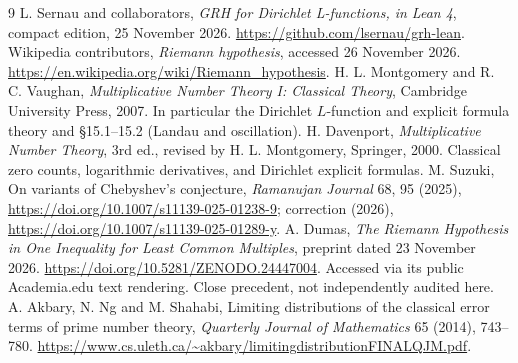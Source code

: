\documentclass[11pt]{article}
\begin{document}
\begin{thebibliography}{9}\small
{} L. Sernau and collaborators, \emph{GRH for Dirichlet L-functions, in Lean 4}, compact edition, 25 November 2026. \url{https://github.com/lsernau/grh-lean}.
 Wikipedia contributors, \emph{Riemann hypothesis}, accessed 26 November 2026. \url{https://en.wikipedia.org/wiki/Riemann_hypothesis}.
 H. L. Montgomery and R. C. Vaughan, \emph{Multiplicative Number Theory I: Classical Theory}, Cambridge University Press, 2007. In particular the Dirichlet $L$-function and explicit formula theory and \S15.1--15.2 (Landau and oscillation).
 H. Davenport, \emph{Multiplicative Number Theory}, 3rd ed., revised by H. L. Montgomery, Springer, 2000. Classical zero counts, logarithmic derivatives, and Dirichlet explicit formulas.
 M. Suzuki, On variants of Chebyshev's conjecture, \emph{Ramanujan Journal} 68, 95 (2025), \url{https://doi.org/10.1007/s11139-025-01238-9}; correction (2026), \url{https://doi.org/10.1007/s11139-025-01289-y}.
 A. Dumas, \emph{The Riemann Hypothesis in One Inequality for Least Common Multiples}, preprint dated 23 November 2026. \url{https://doi.org/10.5281/ZENODO.24447004}. Accessed via its public Academia.edu text rendering. Close precedent, not independently audited here.
 A. Akbary, N. Ng and M. Shahabi, Limiting distributions of the classical error terms of prime number theory, \emph{Quarterly Journal of Mathematics} 65 (2014), 743--780. \url{https://www.cs.uleth.ca/~akbary/limitingdistributionFINALQJM.pdf}.
\end{thebibliography}
\end{document}

